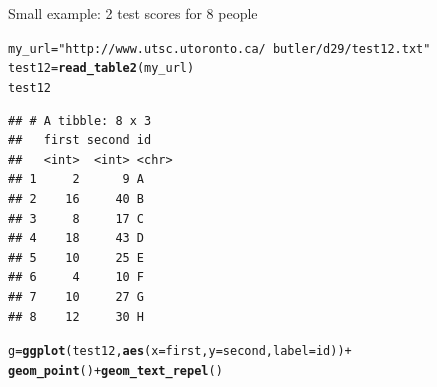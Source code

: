 \documentclass[unknownkeysallowed]{beamer}\usepackage[]{graphicx}\usepackage[]{color}
\makeatletter
\newcommand{\hlstr}[1]{\textcolor[rgb]{0.192,0.494,0.8}{#1}}%
\newcommand{\hlopt}[1]{\textcolor[rgb]{0,0,0}{#1}}%
\newcommand{\hlstd}[1]{\textcolor[rgb]{0.345,0.345,0.345}{#1}}%
\newcommand{\hlkwb}[1]{\textcolor[rgb]{0.69,0.353,0.396}{#1}}%
\newcommand{\hlkwc}[1]{\textcolor[rgb]{0.333,0.667,0.333}{#1}}%
\newcommand{\hlkwd}[1]{\textcolor[rgb]{0.737,0.353,0.396}{\textbf{#1}}}%
\newenvironment{kframe}{%
 \def\at@end@of@kframe{}%
 \ifinner\ifhmode%
  \def\at@end@of@kframe{\end{minipage}}%
  \begin{minipage}{\columnwidth}%
 \fi\fi%
 \def\FrameCommand##1{\hskip\@totalleftmargin \hskip-\fboxsep
 \colorbox{shadecolor}{##1}\hskip-\fboxsep
     \hskip-\linewidth \hskip-\@totalleftmargin \hskip\columnwidth}%
 \MakeFramed {\advance\hsize-\width
   \@totalleftmargin\z@ \linewidth\hsize
   \@setminipage}}%
 {\par\unskip\endMakeFramed%
 \at@end@of@kframe}
\newenvironment{knitrout}{}{} %
\makeatother
\begin{document}
\begin{frame}[fragile]{Small example: 2 test scores for 8 people}

\begin{knitrout}\small
{}\color{fgcolor}\begin{kframe}
\begin{alltt}
\hlstd{my_url}\hlkwb{=}\hlstr{"http://www.utsc.utoronto.ca/~butler/d29/test12.txt"}
\hlstd{test12}\hlkwb{=}\hlkwd{read_table2}\hlstd{(my_url)}
\hlstd{test12}
\end{alltt}
\begin{verbatim}
## # A tibble: 8 x 3
##   first second id   
##   <int>  <int> <chr>
## 1     2      9 A    
## 2    16     40 B    
## 3     8     17 C    
## 4    18     43 D    
## 5    10     25 E    
## 6     4     10 F    
## 7    10     27 G    
## 8    12     30 H
\end{verbatim}
\end{kframe}
\end{knitrout}

\begin{knitrout}
\color{fgcolor}\begin{kframe}
\begin{alltt}
\hlstd{g}\hlkwb{=}\hlkwd{ggplot}\hlstd{(test12,}\hlkwd{aes}\hlstd{(}\hlkwc{x}\hlstd{=first,}\hlkwc{y}\hlstd{=second,}\hlkwc{label}\hlstd{=id))}\hlopt{+}
  \hlkwd{geom_point}\hlstd{()}\hlopt{+}\hlkwd{geom_text_repel}\hlstd{()}
\end{alltt}
\end{kframe}
\end{knitrout}
    
\end{frame}
\end{document}
